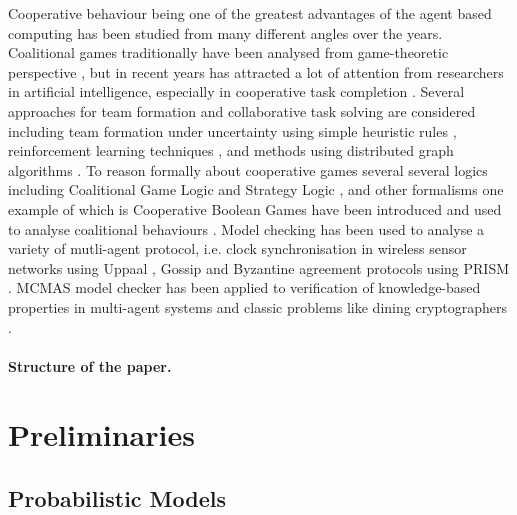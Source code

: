 \documentclass{llncs}
\begin{document}
Cooperative behaviour being one of the greatest advantages of the agent based computing has been studied from many different angles over the years. Coalitional games traditionally have been analysed from game-theoretic perspective \cite{osborne1994course}, but in recent years has attracted a lot of attention from researchers in artificial intelligence, especially in cooperative task completion \cite{shehory1998methods}. Several approaches for team formation and collaborative task solving are considered including team formation under uncertainty using simple heuristic rules \cite{kraus2003coalition}, reinforcement learning techniques \cite{abdallah2004organization}, and methods using distributed graph algorithms \cite{manisterski2006forming}. To reason formally about cooperative games several several logics  including Coalitional Game Logic \cite{agotnes2009reasoning} and Strategy Logic \cite{chatterjee2007strategy}, and other formalisms one example of which is Cooperative Boolean Games \cite{dunne2008cooperative} have been introduced and used to analyse coalitional behaviours \cite{bonzon2007efficient}. Model checking has been used to analyse a variety of mutli-agent protocol, i.e. clock synchronisation in wireless sensor networks using Uppaal \cite{heidarian2009analysis}, Gossip  \cite{KNP08d} and Byzantine agreement protocols  \cite{KN02} using PRISM   \cite{KNP11}. MCMAS model checker has been applied to verification of knowledge-based properties in multi-agent systems and classic problems like dining cryptographers \cite{lomuscio2006mcmas}.


\paragraph{Structure of the paper.}


\section{Preliminaries}


\subsection{Probabilistic Models}
\end{document}
